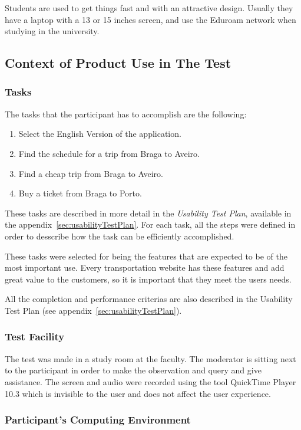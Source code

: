 \documentclass[a4paper]{article}
\begin{document}
Students are used to get things fast and with an attractive design. Usually they have a laptop with a 13 or 15 inches screen, and use the 
Eduroam network when studying in the university.

\subsection{Context of Product Use in The Test}
\subsubsection{Tasks}
\label{sec:tasks}
The tasks that the participant has to accomplish are the following:

\begin{enumerate}
  \item Select the English Version of the application.
  \item Find the schedule for a trip from Braga to Aveiro.
  \item Find a cheap trip from Braga to Aveiro.
  \item Buy a ticket from Braga to Porto.
\end{enumerate}

These tasks are described in more detail in the \emph{Usability Test Plan}, available in the appendix~\ref{sec:usabilityTestPlan}. For each task, all the steps were defined in order to desscribe how the task can be efficiently accomplished.

These tasks were selected for being the features that are expected to be of the most important use. Every transportation website has these features and add great value to the customers, so it is important that they meet the users needs.

All the completion and performance criterias are also described in the Usability Test Plan (see appendix~\ref{sec:usabilityTestPlan}).

\subsubsection{Test Facility}

The test was made in a study room at the faculty. The moderator is sitting next to the participant in order to make the observation and query and give assistance. The screen and audio were recorded using the tool QuickTime Player 10.3 which is invisible to the user and does not affect the user experience.

\subsubsection{Participant’s Computing Environment}
\end{document}
